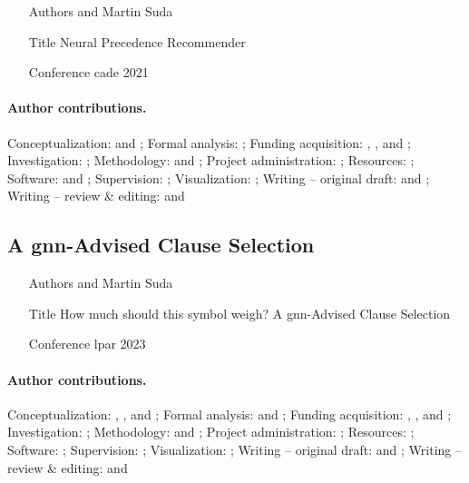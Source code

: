 \documentclass{article}
\begin{document}
\begin{itemize}
\item[Authors]  and Martin Suda
\item[Title] Neural Precedence Recommender
\item[Conference] \Acrfull{cade} 2021
\end{itemize}

\paragraph{Author contributions.}
Conceptualization:            \MS{} and \FB{};
Formal analysis:              \FB{};
Funding acquisition:          \MS{}, \FB{}, and \JU{};
Investigation:                \FB{};
Methodology:                  \FB{} and \MS{};
Project administration:       \MS{};
Resources:                    \JU{};
Software:                     \FB{} and \MS{};
Supervision:                  \MS{};
Visualization:                \FB{};
Writing -- original draft:    \FB{} and \MS{};
Writing -- review \& editing: \FB{} and \MS{}

\subsection{A \acrshort{gnn}-Advised Clause Selection \cite{DBLP:conf/lpar/Bartek023}}

\begin{itemize}
\item[Authors]  and Martin Suda
\item[Title] How much should this symbol weigh? A \acrshort{gnn}-Advised Clause Selection
\item[Conference] \Acrfull{lpar} 2023
\end{itemize}

\paragraph{Author contributions.}
Conceptualization:            \MS{}, \FB{}, and \CK{};
Formal analysis:              \FB{} and \MS{};
Funding acquisition:          \MS{}, \JU{}, and \FB{};
Investigation:                \FB{};
Methodology:                  \FB{} and \MS{};
Project administration:       \MS{};
Resources:                    \JU{};
Software:                     \FB{};
Supervision:                  \MS{};
Visualization:                \FB{};
Writing -- original draft:    \FB{} and \MS{};
Writing -- review \& editing: \FB{} and \MS{}
\end{document}
